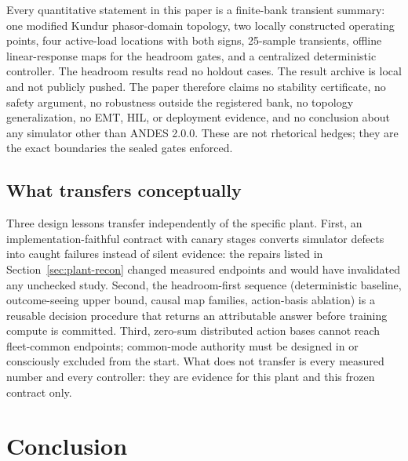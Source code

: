 \documentclass[journal]{IEEEtran}
\begin{document}
Every quantitative statement in this paper is a finite-bank transient summary: one modified Kundur phasor-domain topology, two locally constructed operating points, four active-load locations with both signs, 25-sample transients, offline linear-response maps for the headroom gates, and a centralized deterministic controller. The headroom results read no holdout cases. The result archive is local and not publicly pushed. The paper therefore claims no stability certificate, no safety argument, no robustness outside the registered bank, no topology generalization, no EMT, HIL, or deployment evidence, and no conclusion about any simulator other than ANDES 2.0.0. These are not rhetorical hedges; they are the exact boundaries the sealed gates enforced.

\subsection{What transfers conceptually}
\label{sec:transfers}

Three design lessons transfer independently of the specific plant. First, an implementation-faithful contract with canary stages converts simulator defects into caught failures instead of silent evidence: the repairs listed in Section~\ref{sec:plant-recon} changed measured endpoints and would have invalidated any unchecked study. Second, the headroom-first sequence (deterministic baseline, outcome-seeing upper bound, causal map families, action-basis ablation) is a reusable decision procedure that returns an attributable answer before training compute is committed. Third, zero-sum distributed action bases cannot reach fleet-common endpoints; common-mode authority must be designed in or consciously excluded from the start. What does not transfer is every measured number and every controller: they are evidence for this plant and this frozen contract only.

\section{Conclusion}
\label{sec:conclusion}
\end{document}
